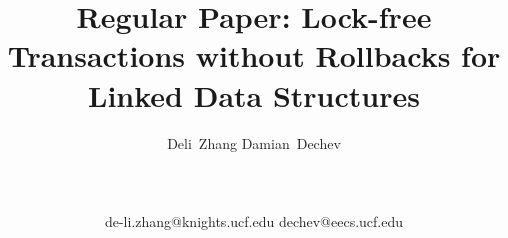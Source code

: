 \documentclass[]{sig-alternate-05-2015}
\begin{document}
\title{Regular Paper: Lock-free Transactions without Rollbacks for Linked Data Structures}



\author{
    \alignauthor
    Deli~Zhang \hspace{14pt} Damian~Dechev\\
    \\
    \\
     \\
    de-li.zhang@knights.ucf.edu  dechev@eecs.ucf.edu
}

\maketitle
\end{document}
